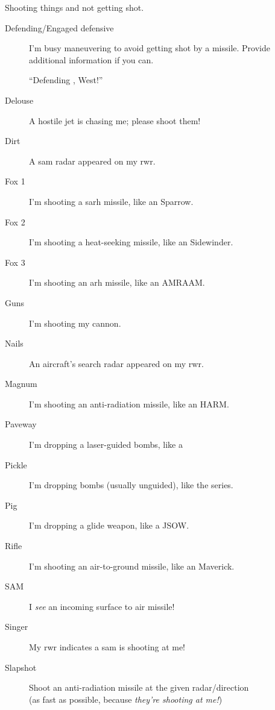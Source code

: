 Shooting things and not getting shot.
\begin{description}

\item[Defending/Engaged defensive] I'm busy maneuvering to avoid getting shot by
    a missile. Provide additional information if you can.

    ``Defending , West!''

\item[Delouse] A hostile jet is chasing me; please shoot them!

\item[Dirt] A \ac{sam} radar appeared on my \ac{rwr}.

\item[Fox 1] I'm shooting a \ac{sarh} missile,
    like an  Sparrow.
\item[Fox 2] I'm shooting a heat-seeking missile, like an
     Sidewinder.
\item[Fox 3] I'm shooting an \ac{arh} missile,
    like an  AMRAAM.

\item[Guns] I'm shooting my cannon.

\item[Nails] An aircraft's search radar appeared on my \ac{rwr}.

\item[Magnum] I'm shooting an anti-radiation missile,
    like an  HARM.

\item[Paveway] I'm dropping a laser-guided bombs,
    like a 

\item[Pickle] I'm dropping bombs (usually unguided),
    like the  series.

\item[Pig] I'm dropping a glide weapon, like a  JSOW.

\item[Rifle] I'm shooting an air-to-ground missile,
    like an  Maverick.

\item[SAM] I \emph{see} an incoming surface to air missile!

\item[Singer] My \ac{rwr} indicates a \ac{sam} is shooting at me!

\item[Slapshot] Shoot an anti-radiation missile at the given radar/direction \\
    (as fast as possible, because \emph{they're shooting at me!})


\end{description}
